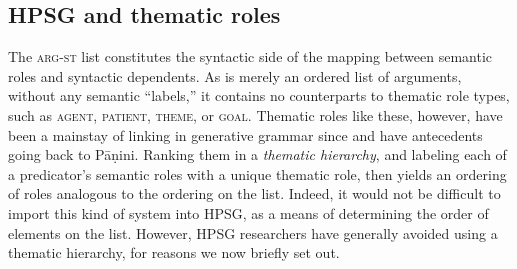 \documentclass[output=paper
                ,modfonts
                ,nonflat
	        ,collection
	        ,collectionchapter
	        ,collectiontoclongg
 	        ,biblatex
                ,babelshorthands
                ,newtxmath
                ,draftmode
                ,colorlinks, citecolor=brown
]{./langsci/langscibook}
\begin{document}

\subsection{HPSG and thematic roles}
\label{thetaroles}


The \textsc{arg-st} list constitutes the syntactic side of the mapping between semantic roles and syntactic dependents.  As \argst is merely an ordered list of arguments, without any semantic ``labels,'' it contains no counterparts to thematic role types, such as \textsc{agent}, \textsc{patient}, \textsc{theme}, or \textsc{goal}.  Thematic roles like these, however, have been a mainstay of linking in generative grammar since \citet{Fillmore1968} and have antecedents going back to P\={a}\d{n}ini.
Ranking them in a  \emph{thematic hierarchy}, and labeling each of a predicator's semantic roles with a unique thematic role, then yields an ordering of roles analogous to the ordering on the \argst list.  Indeed, it would not be difficult to import this kind of system into HPSG, as a means of determining the order of elements on the \argst list.  However, HPSG researchers have generally avoided using a thematic hierarchy, for reasons we now briefly set out.
\end{document}
